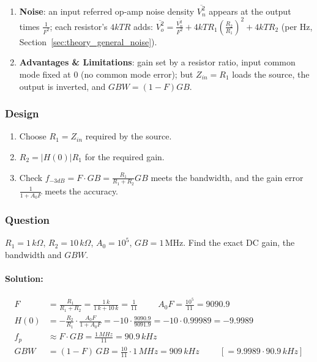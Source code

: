\begin{enumerate}
    \(I_{B+} = I_{B-} = I_B\) and \(R_p = R_1 \parallel R_2 = \frac{R_1 R_2}{R_1 + R_2}\):
    \begin{align*}
      \left(1 + \frac{R_2}{R_1}\right) I_B \frac{R_1 R_2}{R_1 + R_2} &= \frac{R_1 + R_2}{R_1}\cdot\frac{R_1 R_2}{R_1 + R_2} I_B = I_B R_2 \hspace{1cm} \Rightarrow \hspace{1cm} V_{OUT} = \frac{V_{OS}}{F} \pm I_{OS} R_2
    \end{align*}
    the bias currents cancel, leaving only the offset current \(I_{OS} = |I_{B+} - I_{B-}|\).
  \item \textbf{Noise}: an input referred op-amp noise density \(\overline{V_n^2}\) appears at the output times
    \(\frac{1}{F^2}\); each resistor's \(4kTR\) adds: \(\overline{V_{o}^2} = \frac{\overline{V_n^2}}{F^2} + 4kTR_1\left(\frac{R_2}{R_1}\right)^2 + 4kTR_2\) (per Hz,
    Section~\ref{sec:theory_general_noise}).
  \item \textbf{Advantages \& Limitations}: gain set by a resistor ratio, input
    common mode fixed at 0 (no common mode error); but \(Z_{in} = R_1\) loads the source,
    the output is inverted, and \(GBW = (1 - F) GB\).
\end{enumerate}

\subsubsection{Design}
\begin{enumerate}
  \item Choose \(R_1 = Z_{in}\) required by the source.
  \item \(R_2 = |H(0)| R_1\) for the required gain.
  \item Check \(f_{-3dB} = F \cdot GB = \frac{R_1}{R_1 + R_2} GB\) meets the bandwidth, and the
    gain error \(\frac{1}{1 + A_0 F}\) meets the accuracy.
\end{enumerate}

\subsubsection{Question}
\(R_1 = 1\,k\Omega\), \(R_2 = 10\,k\Omega\), \(A_0 = 10^5\), \(GB = 1\,\)MHz. Find the exact DC gain,
the bandwidth and \(GBW\).
\paragraph{Solution:}
\begin{align*}
  F &= \frac{R_1}{R_1 + R_2} = \frac{1\,k}{1\,k + 10\,k} = \frac{1}{11} \hspace{1cm} A_0 F = \frac{10^5}{11} = 9090.9 \\
  H(0) &= -\frac{R_2}{R_1}\cdot\frac{A_0 F}{1 + A_0 F} = -10 \cdot \frac{9090.9}{9091.9} = -10 \cdot 0.99989 = -9.9989 \\
  f_p &\approx F \cdot GB = \frac{1\,MHz}{11} = 90.9\,kHz \\
  GBW &= (1 - F)\, GB = \frac{10}{11} \cdot 1\,MHz = 909\,kHz \hspace{1cm} [= 9.9989 \cdot 90.9\,kHz]
\end{align*}

